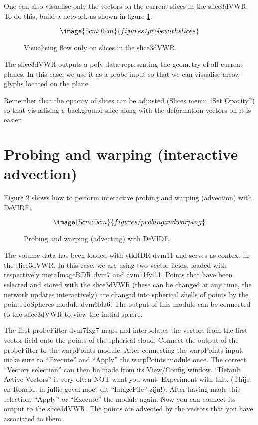 One can also visualise only the vectors on the current slices in the
slice3dVWR.  To do this, build a network as shown in figure
\ref{figprobewithslices}.

\begin{figure}
$$\image{5cm;0cm}{figures/probewithslices}$$
\caption{Visualising flow only on slices in the slice3dVWR.}\label{figprobewithslices}
\end{figure}

The slice3dVWR outputs a poly data representing the geometry of all
current planes.  In this case, we use it as a probe input so that we
can visualise arrow glyphs located on the plane.

Remember that the opacity of slices can be adjusted (Slices menu:
``Set Opacity'') so that visualising a background slice along with the
deformation vectors on it is easier.

\section{Probing and warping (interactive advection)}
Figure \ref{figPAW} shows how to perform interactive probing and
warping (advection) with DeVIDE.

\begin{figure}
$$\image{5cm;0cm}{figures/probingandwarping}$$
\caption{Probing and warping (advecting) with DeVIDE.}\label{figPAW}
\end{figure}

The volume data has been loaded with vtkRDR dvm11 and serves as
context in the slice3dVWR.  In this case, we are using two vector
fields, loaded with respectively metaImageRDR dvm7 and dvm11fyi11.
Points that have been selected and stored with the slice3dVWR (these
can be changed at any time, the network updates interactively) are
changed into spherical shells of points by the pointsToSpheres module
dvm6ldz6.  The output of this module can be connected to the
slice3dVWR to view the initial sphere.

The first probeFilter dvm7fxg7 maps and interpolates the vectors from
the first vector field onto the points of the spherical cloud.
Connect the output of the probeFilter to the warpPoints module.  After
connecting the warpPoints input, make sure to ``Execute'' and
``Apply'' the warpPoints module once.  The correct ``Vectors
selection'' can then be made from its View/Config window.  ``Default
Active Vectors'' is very often NOT what you want.  Experiment with
this.  (Thijs en Ronald, in jullie geval moet dit ``ImageFile''
zijn!).  After having made this selection, ``Apply'' or ``Execute''
the module again.  Now you can connect its output to the slice3dVWR.
The points are advected by the vectors that you have associated to
them.

